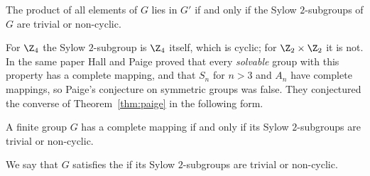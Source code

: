 \begin{fact}\label{fact:sylow}
The product of all elements of $G$ lies in $G'$ if and only if the Sylow $2$-subgroups of $G$ are trivial or non-cyclic.
\end{fact}

For $\Z_4$ the Sylow $2$-subgroup is $\Z_4$ itself, which is cyclic; for $\Z_2\times\Z_2$ it is not. In the same paper Hall and Paige proved that every \emph{solvable} group with this property has a complete mapping, and that $S_n$ for $n>3$ and $A_n$ have complete mappings, so Paige's conjecture on symmetric groups was false. They conjectured the converse of Theorem~\ref{thm:paige} in the following form.

\begin{conjecture}\label{conj:hp}
A finite group $G$ has a complete mapping if and only if its Sylow $2$-subgroups are trivial or non-cyclic.
\end{conjecture}

We say that $G$ satisfies the  if its Sylow $2$-subgroups are trivial or non-cyclic.
